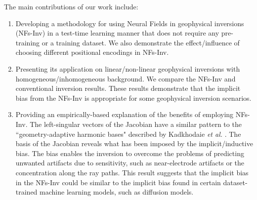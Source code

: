 \documentclass[lettersize,journal]{IEEEtran}
\begin{document}
The main contributions of our work include: 
\begin{enumerate}
\item{Developing a methodology for using Neural Fields in geophysical inversions (NFs-Inv) in a test-time learning manner that does not require any pre-training or a training dataset. We also demonstrate the effect/influence of choosing different positional encodings in NFs-Inv.}
\item{Presenting its application on linear/non-linear geophysical inversions with homogeneous/inhomogeneous background. We compare the NFs-Inv and conventional inversion results. These results demonstrate that the implicit bias from the NFs-Inv is appropriate for some geophysical inversion scenarios.}
\item{Providing an empirically-based explanation of the benefits of employing NFs-Inv. The left-singular vectors of the Jacobian have a similar pattern to the ``geometry-adaptive harmonic bases" described by Kadkhodaie \textit{et al.} \cite{Zahra}. The basis of the Jacobian reveals what has been imposed by the implicit/inductive bias. The bias enables the inversion to overcome the problems of predicting unwanted artifacts due to sensitivity, such as near-electrode artifacts or the concentration along the ray paths. This result suggests that the implicit bias in the NFs-Inv could be similar to the implicit bias found in certain dataset-trained machine learning models, such as diffusion models.}
\end{enumerate}


\end{document}
